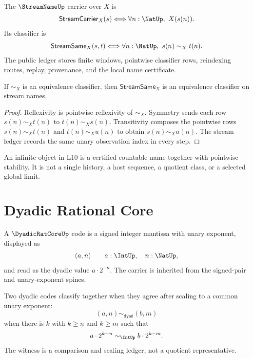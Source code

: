 \begin{definition}
\label{def:countable-completion-streamname-carrier}
The $\StreamNameUp$ carrier over $X$ is
$$
\mathsf{StreamCarrier}_X(s)
\Longleftrightarrow
\forall n:\NatUp,\ X(s(n)).
$$
Its classifier is
$$
\mathsf{StreamSame}_X(s,t)
\Longleftrightarrow
\forall n:\NatUp,\ s(n)\sim_X t(n).
$$
The public ledger stores finite windows, pointwise classifier rows, reindexing
routes, replay, provenance, and the local name certificate.
\end{definition}

\begin{theorem}
\label{thm:countable-completion-pointwise-stream-classifier}
If $\sim_X$ is an equivalence classifier, then
$\mathsf{StreamSame}_X$ is an equivalence classifier on stream names.
\end{theorem}

\begin{proof}
Reflexivity is pointwise reflexivity of $\sim_X$.  Symmetry sends each row
$s(n)\sim_X t(n)$ to $t(n)\sim_X s(n)$.  Transitivity composes the pointwise
rows $s(n)\sim_X t(n)$ and $t(n)\sim_X u(n)$ to obtain
$s(n)\sim_X u(n)$.  The stream ledger records the same unary observation
index in every step.
\end{proof}

\begin{principle}
\label{prin:countable-completion-countable-name-boundary}
An infinite object in L10 is a certified countable name together with
pointwise stability.  It is not a single history, a host sequence, a quotient
class, or a selected global limit.
\end{principle}

\section{Dyadic Rational Core}
\label{sec:countable-completion-dyadic-core}

\begin{definition}
\label{def:countable-completion-dyadic-code}
A $\DyadicRatCoreUp$ code is a signed integer mantissa with unary exponent,
displayed as
$$
(a,n)
\qquad
a:\IntUp,\quad n:\NatUp,
$$
and read as the dyadic value $a\cdot 2^{-n}$.  The carrier is inherited from
the signed-pair and unary-exponent spines.
\end{definition}

\begin{definition}
\label{def:countable-completion-dyadic-classifier}
Two dyadic codes classify together when they agree after scaling to a common
unary exponent:
$$
(a,n)\sim_{\mathsf{dyad}}(b,m)
$$
when there is $k$ with $k\ge n$ and $k\ge m$ such that
$$
a\cdot 2^{k-n}\sim_{\IntUp} b\cdot 2^{k-m}.
$$
The witness is a comparison and scaling ledger, not a quotient
representative.
\end{definition}


